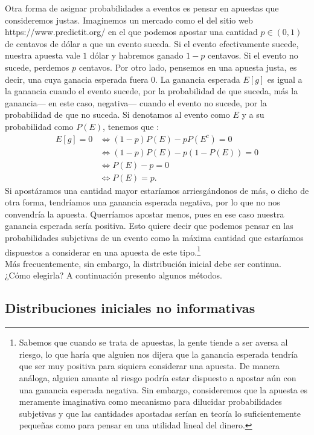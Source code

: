 Otra forma de asignar probabilidades a eventos es pensar en apuestas que consideremos justas. Imaginemos un mercado como el del sitio web 	https://www.predictit.org/ en el que podemos apostar una cantidad $p \in (0,1)$ de centavos de dólar a que un evento suceda. Si el evento efectivamente sucede, nuestra apuesta vale $1$ dólar y habremos ganado $1-p$ centavos. Si el evento no sucede, perdemos $p$ centavos. Por otro lado, pensemos en una apuesta justa, es decir, una cuya ganacia esperada fuera $0$. La ganancia esperada $E[g]$ es igual a la ganancia cuando el evento sucede, por la probabilidad de que suceda, más la ganancia--- en este caso, negativa--- cuando el evento no sucede, por la probabilidad de que no suceda. Si denotamos al evento como $E$ y a su probabilidad como $P(E)$, tenemos que : 
\begin{align*}
E[g] = 0 &\Leftrightarrow (1-p)P(E) - pP(E^c) = 0 \\
&\Leftrightarrow (1-p)P(E) - p(1-P(E))= 0\\ 
&\Leftrightarrow P(E) - p = 0\\
&\Leftrightarrow P(E) = p.
\end{align*}
Si apostáramos una cantidad mayor estaríamos arriesgándonos de más, o dicho de otra forma, tendríamos una ganancia esperada negativa, por lo que no nos convendría la apuesta. Querríamos apostar menos, pues en ese caso nuestra ganancia esperada sería positiva. Esto quiere decir que podemos pensar en las probabilidades subjetivas de un evento como la máxima cantidad que estaríamos dispuestos a considerar en una apuesta de este tipo.\footnote{Sabemos que cuando se trata de apuestas, la gente tiende a ser aversa al riesgo, lo que haría que alguien nos dijera que la ganancia esperada tendría que ser muy positiva para siquiera considerar una apuesta. De manera análoga, alguien amante al riesgo podría estar dispuesto a apostar aún con una ganancia esperada negativa. Sin embargo, consideremos que la apuesta es meramente imaginativa como mecanismo para dilucidar probabilidades subjetivas y que las cantidades apostadas serían en teoría lo suficientemente pequeñas como para pensar en una utilidad lineal del dinero.}\\

Más frecuentemente, sin embargo, la distribución inicial debe ser continua. ¿Cómo elegirla? A continuación presento algunos métodos.  

\subsection{Distribuciones iniciales no informativas}

